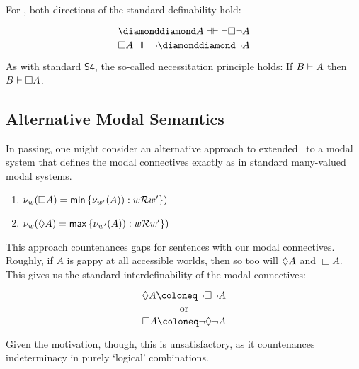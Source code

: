 \noindent For \GDiam, both directions of the standard definability hold:

\[\GDiam A \dashv\vdash\neg\Box\neg A\]
\[\Box A\dashv\vdash\neg\GDiam\neg A\]

\noindent As with standard $\mathsf{S4}$, the so-called necessitation principle holds: If ${B}\vdash{A}$ then ${B}\vdash{\Box A}$.




\subsection{Alternative Modal Semantics}

In passing, one might consider an alternative approach to extended \GO\ to a modal system that defines the modal connectives exactly as in standard many-valued modal systems. 

\begin{enumerate}
	\item $ \mathcal{\nu}_{ w }({ \Box A }) 		= \mathsf{min}\left\{{ \mathcal{\nu}_{ w' }({ A }) ) :  { w } \mathcal{R} { w' }  }\right\} ) $
	\item $ \mathcal{\nu}_{ w }({ \Diamond A }) 		= \mathsf{max}\left\{{ \mathcal{\nu}_{ w' }({ A }) ) :  { w } \mathcal{R} { w' }  }\right\} ) $
\end{enumerate}

\noindent This approach countenances gaps for sentences with our modal connectives. Roughly, if $A$ is gappy at all accessible worlds, then so too will $\Diamond A$ and $\Box A$. This gives us the standard interdefinability of the modal connectives:

\[ \Diam A \Defined \neg \Box \neg A \]
\[ \mbox{or} \]
\[ \Box A \Defined \neg \Diam \neg A\]

\noindent Given the motivation, though, this is unsatisfactory, as it countenances indeterminacy in purely `logical' combinations.

